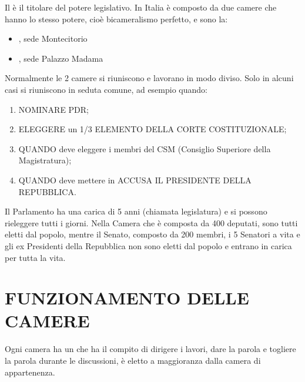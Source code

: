 \documentclass[letterpaper,10pt,italian]{sphinxmanual}
\begin{document}
\sphinxAtStartPar
Il  è il titolare del potere legislativo.
In Italia è composto da due camere che hanno lo stesso potere, cioè bicameralismo perfetto, e sono la:
\begin{itemize}
\item {} 
\sphinxAtStartPar
{}, sede Montecitorio

\item {} 
\sphinxAtStartPar
{}, sede Palazzo Madama

\end{itemize}

\sphinxAtStartPar
Normalmente le 2 camere si riuniscono e lavorano in modo diviso.
Solo in alcuni casi si riuniscono in seduta comune, ad esempio quando:
\begin{enumerate}
%
\item {} 
\sphinxAtStartPar
NOMINARE PDR;

\item {} 
\sphinxAtStartPar
ELEGGERE un 1/3 ELEMENTO DELLA CORTE COSTITUZIONALE;

\item {} 
\sphinxAtStartPar
QUANDO deve eleggere i membri del CSM (Consiglio Superiore della Magistratura);

\item {} 
\sphinxAtStartPar
QUANDO deve mettere in ACCUSA IL PRESIDENTE DELLA REPUBBLICA.

\end{enumerate}

\sphinxAtStartPar
Il Parlamento ha una carica di 5 anni (chiamata legislatura) e si possono rieleggere tutti i giorni. Nella Camera che è composta da 400 deputati, sono tutti eletti dal popolo, mentre il Senato, composto da 200 membri, i 5 Senatori a vita e gli ex Presidenti della Repubblica non sono eletti dal popolo e entrano in carica per tutta la vita.


\section{FUNZIONAMENTO DELLE CAMERE}
\label{\detokenize{IL PARLAMENTO:funzionamento-delle-camere}}
\sphinxAtStartPar
Ogni camera ha un  che ha il compito di dirigere i lavori, dare la parola e togliere la parola
durante le discussioni, è eletto a maggioranza dalla camera di appartenenza.
\end{document}
